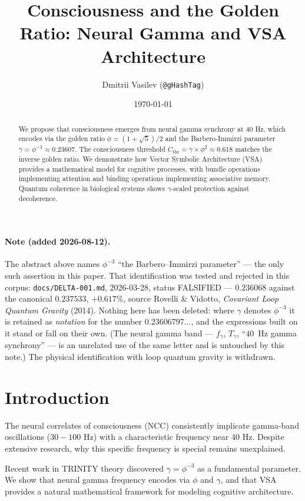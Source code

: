 \documentclass[12pt,a4paper]{article}
\title{Consciousness and the Golden Ratio: Neural Gamma and VSA Architecture}
\author{Dmitrii Vasilev (\texttt{@gHashTag})}
\date{\today}
\begin{document}
\maketitle

\begin{abstract}
We propose that consciousness emerges from neural gamma synchrony at $40$ Hz, which encodes via the golden ratio $\phi = (1+\sqrt{5})/2$ and the Barbero-Immirzi parameter $\gamma = \phi^{-3} \approx 0.23607$. The consciousness threshold $C_{\text{thr}} = \gamma \times \phi^2 \approx 0.618$ matches the inverse golden ratio. We demonstrate how Vector Symbolic Architecture (VSA) provides a mathematical model for cognitive processes, with bundle operations implementing attention and binding operations implementing associative memory. Quantum coherence in biological systems shows $\gamma$-scaled protection against decoherence.
\end{abstract}

\paragraph{Note (added 2026-08-12).} The abstract above names $\phi^{-3}$ ``the Barbero--Immirzi parameter'' --- the only such assertion in this paper. That identification was tested and rejected in this corpus: \texttt{docs/DELTA-001.md}, 2026-03-28, status FALSIFIED --- $0.236068$ against the canonical $0.237533$, $+0.617\%$, source Rovelli \& Vidotto, \emph{Covariant Loop Quantum Gravity} (2014). Nothing here has been deleted: where $\gamma$ denotes $\phi^{-3}$ it is retained as \emph{notation} for the number $0.23606797\ldots$, and the expressions built on it stand or fall on their own. (The neural gamma band --- $f_\gamma$, $T_\gamma$, ``$40$~Hz gamma synchrony'' --- is an unrelated use of the same letter and is untouched by this note.) The physical identification with loop quantum gravity is withdrawn.

\section{Introduction}

The neural correlates of consciousness (NCC) consistently implicate gamma-band oscillations ($30-100$ Hz) with a characteristic frequency near $40$ Hz. Despite extensive research, why this specific frequency is special remains unexplained.

Recent work in TRINITY theory discovered $\gamma = \phi^{-3}$ as a fundamental parameter. We show that neural gamma frequency encodes via $\phi$ and $\gamma$, and that VSA provides a natural mathematical framework for modeling cognitive architecture.
\end{document}
